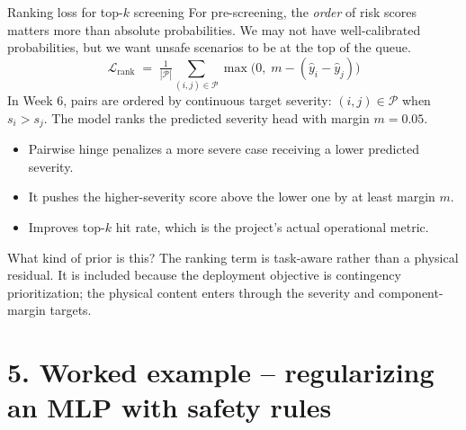 \documentclass[aspectratio=169,10pt]{beamer}
\begin{document}
\begin{frame}{Ranking loss for top-$k$ screening}
For pre-screening, the \emph{order} of risk scores matters more than absolute probabilities. We may not have well-calibrated probabilities, but we want unsafe scenarios to be at the top of the queue.
\vspace{0.4em}
\begin{equation*}
\mathcal{L}_{\text{rank}} \;=\; \tfrac{1}{|\mathcal{P}|} \sum_{(i, j) \in \mathcal{P}} \max\!\bigl(0, \;m - (\hat{y}_i - \hat{y}_j)\bigr)
\end{equation*}
In Week 6, pairs are ordered by continuous target severity: $(i,j)\in\mathcal P$ when $s_i>s_j$. The model ranks the predicted severity head with margin $m=0.05$.
\vspace{0.3em}
\begin{itemize}
  \item Pairwise hinge penalizes a more severe case receiving a lower predicted severity.
  \item It pushes the higher-severity score above the lower one by at least margin $m$.
  \item Improves top-$k$ hit rate, which is the project's actual operational metric.
\end{itemize}
\vspace{0.3em}
\begin{block}{What kind of prior is this?}
The ranking term is task-aware rather than a physical residual. It is included because the deployment objective is contingency prioritization; the physical content enters through the severity and component-margin targets.
\end{block}
\end{frame}

\section*{5. Worked example -- regularizing an MLP with safety rules}
\end{document}
